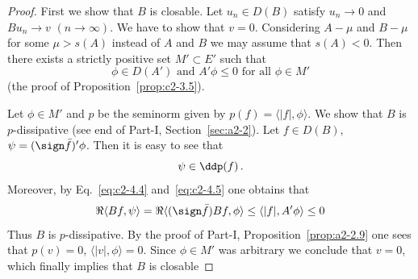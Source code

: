 \begin{proof}
First we show that $B$ is closable.
Let $u_{n} \in D(B)$ satisfy $u_{n} \to 0$ and $Bu_{n} \to v$ $(n \to \infty)$.
We have to
show that $v = 0$. 
Considering $A - \mu$ and $B - \mu$ for some $\mu > s(A)$ instead of\/ $A$ and $B$ we may assume that $s(A) < 0$. 
Then there exists a strictly positive set $M' \subset E'$ such that
\begin{equation}\label{eq:c2-4.5}
\phi \in D(A') \text{ and } A'\phi \leq 0 \text{ for all } \phi \in M'
\end{equation}
(\cf the proof of Proposition~\ref{prop:c2-3.5}).

Let $\phi \in M'$ and $p$ be the seminorm given by $p(f) = \langle|f|,\phi\rangle$. 
We show that $B$ is $p$-dissipative (see end of Part-I, Section~\ref{sec:a2-2}).
Let $f \in D(B)$, $\psi = (\sign  \bar{f})'\phi$. 
Then it is easy to see that 
\[
\psi \in \ddp(f)\,.
\]
Moreover, by Eq.~\eqref{eq:c2-4.4} and~\eqref{eq:c2-4.5} one obtains that 
\[
\Re\langle Bf,\psi\rangle = \Re\langle(\sign  \bar{f})Bf,\phi\rangle \leq \langle|f|,A'\phi\rangle \leq 0
\]
Thus $B$ is $p$-dissipative. 
By the proof of Part-I, Proposition~\ref{prop:a2-2.9} 
one sees that $p(v) = 0$, \ie $\langle|v|,\phi\rangle = 0$.
Since $\phi \in M'$ was arbitrary we conclude that $v = 0$, which finally implies that $B$ is closable


\end{proof}
